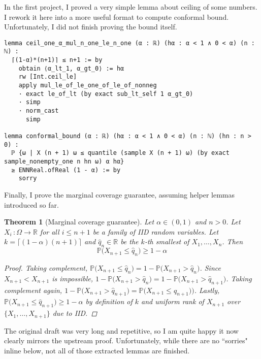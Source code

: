 \documentclass[a4paper, 12pt]{article}
\newtheorem{theorem}{Theorem}
\newcommand{\R}{\mathbb{R}}
\renewcommand{\P}{\mathbb{P}}
\begin{document}
In the first project, I proved a very simple lemma about ceiling of some numbers.
I rework it here into a more useful format to compute conformal bound.
Unfortunately, I did not finish proving the bound itself.

\begin{lstlisting}
lemma ceil_one_α_mul_n_one_le_n_one (α : ℝ) (hα : α < 1 ∧ 0 < α) (n : ℕ) :
  ⌈(1-α)*(n+1)⌉ ≤ n+1 := by
    obtain ⟨α_lt_1, α_gt_0⟩ := hα
    rw [Int.ceil_le]
    apply mul_le_of_le_one_of_le_of_nonneg
    · exact le_of_lt (by exact sub_lt_self 1 α_gt_0)
    · simp
    · norm_cast
      simp

lemma conformal_bound (α : ℝ) (hα : α < 1 ∧ 0 < α) (n : ℕ) (hn : n > 0) :
  ℙ {ω | X (n + 1) ω ≤ quantile (sample X (n + 1) ω) (by exact sample_nonempty_one n hn ω) α hα}
  ≥ ENNReal.ofReal (1 - α) := by
    sorry
\end{lstlisting}

Finally, I prove the marginal coverage guarantee,
assuming helper lemmas introduced so far.

\begin{theorem}[Marginal coverage guarantee]
  Let $\alpha\in (0,1)$ and $n>0$.
  Let $X_i\,\colon \Omega \to \R$ for all $i\le n+1$
  be a family of IID random variables.
  Let $k=\lceil (1-\alpha)(n+1) \rceil$
  and $\hat{q}_n \in \R$ be the
  $k$-th smallest of $X_1,\ldots,X_n$.
  Then
  $$\P\big( X_{n+1} \le \hat{q}_n \big) \ge 1-\alpha$$
\begin{proof}
  Taking complement,
  $\P\big(X_{n+1} \le\hat{q}_{n}\big)=1-\P\big(X_{n+1} >\hat{q}_{n}\big)$.
  Since $X_{n+1}<X_{n+1}$ is impossible,
  $1-\P\big(X_{n+1} >\hat{q}_{n}\big) = 1-\P\big(X_{n+1} >\hat{q}_{n+1}\big)$.
  Taking complement again,
  $1-\P\big(X_{n+1} >\hat{q}_{n+1}\big) = \P\big(X_{n+1} \le\hat{q}_{n+1}\big))$.
  Lastly, $\P\big( X_{n+1}\le\hat{q}_{n+1} \big)\ge 1-\alpha$ by definition of $k$
  and uniform rank of $X_{n+1}$ over $\{X_1,\ldots,X_{n+1}\}$ due to IID.
\end{proof}
\end{theorem}

The original draft was very long and repetitive,
so I am quite happy it now clearly mirrors the upstream proof.
Unfortunately, while there are no ``sorries" inline below,
not all of those extracted lemmas are finished.
\end{document}
